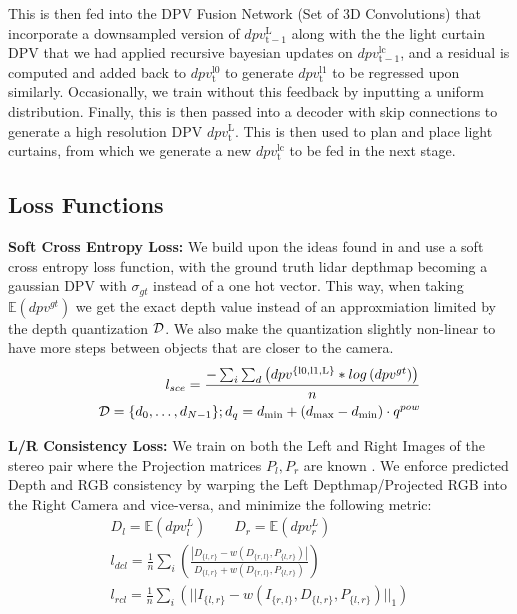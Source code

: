 This is then fed into the DPV Fusion Network (Set of 3D Convolutions) that incorporate a downsampled version of $dpv_{\mathrm{t-1}}^{\mathrm{L}}$ along with the the light curtain DPV that we had applied recursive bayesian updates on $dpv_{\mathrm{t-1}}^{\mathrm{lc}}$, and a residual is computed and added back to $dpv_{\mathrm{t}}^{\mathrm{l0}}$ to generate $dpv_{\mathrm{t}}^{\mathrm{l1}}$ to be regressed upon similarly. Occasionally, we train without this feedback by inputting a uniform distribution. Finally, this is then passed into a decoder with skip connections to generate a high resolution DPV $dpv_{\mathrm{t}}^{\mathrm{L}}$. This is then used to plan and place light curtains, from which we generate a new $dpv_{\mathrm{t}}^{\mathrm{lc}}$ to be fed in the next stage.

\subsection{Loss Functions}

\textbf{Soft Cross Entropy Loss:} We build upon the ideas found in \cite{Yang-2019-118007} and use a soft cross entropy loss function, with the ground truth lidar depthmap becoming a gaussian DPV with $\sigma_{gt}$ instead of a one hot vector. This way, when taking $\mathbb{E}\left(dpv^{gt}\right)$ we get the exact depth value instead of an approxmiation limited by the depth quantization $\mathcal{D}$. We also make the quantization slightly non-linear to have more steps between objects that are closer to the camera.
\small
\begin{align}
   l_{sce}=\frac{-\sum_{i}\sum_{d}\left(dpv^{\mathrm{\{l0,l1,L\}}}*log\left(dpv^{gt}\right)\right)}{n} \\
   \mathcal{D}=\{d_{0},\dots,d_{N-1}\};d_{q}=d_{\text{min}}+(d_{\text{max}}-d_{\text{min}})\cdot q^{pow}
  \label{eq:seloss}
\end{align}
\normalsize

\textbf{L/R Consistency Loss:} We train on both the Left and Right Images of the stereo pair where the Projection matrices $P_{l}, P_{r}$ are known \cite{godard2017unsupervised}. We enforce predicted Depth and RGB consistency by warping the Left Depthmap/Projected RGB into the Right Camera and vice-versa, and minimize the following metric:
\small
\begin{align}
   D_{l}=\mathbb{E}\left(dpv_{l}^{L}\right)\qquad D_{r}=\mathbb{E}\left(dpv_{r}^{L}\right) \\
   l_{dcl}=\frac{1}{n}\sum_{i}\left(\frac{\left|D_{\{l,r\}}-w\left(D_{\{r,l\}},P_{\{l,r\}}\right)\right|}{D_{\{l,r\}}+w\left(D_{\{r,l\}},P_{\{l,r\}}\right)}\right) \\
   l_{rcl}=\frac{1}{n}\sum_{i}\left(||I_{\{l,r\}}-w\left(I_{\{r,l\}},D_{\{l,r\}},P_{\{l,r\}}\right)||_{1}\right)
  \label{eq:lrcons} 
\end{align}
\normalsize

